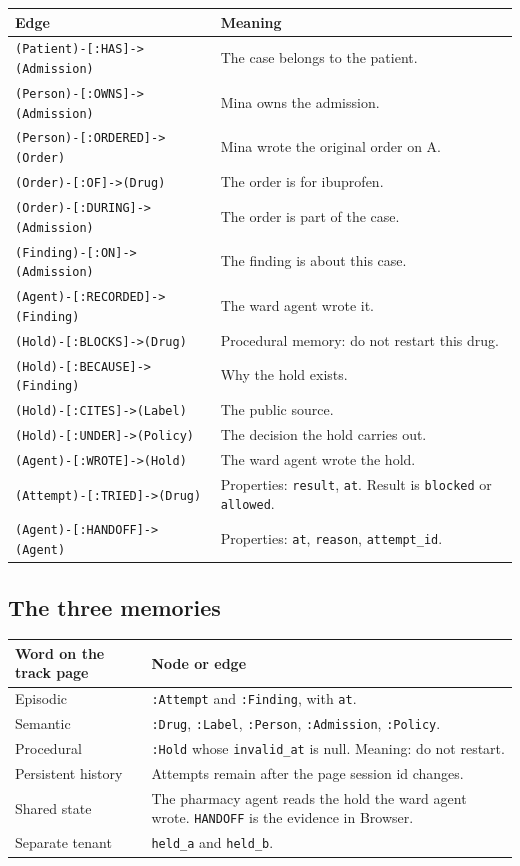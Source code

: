\documentclass[11pt,a4paper]{article}
\newcommand{\code}[1]{\texttt{#1}}
\begin{document}
\begin{center}
\begin{tabular}{@{}ll@{}}
\toprule
\textbf{Edge} & \textbf{Meaning} \\
\midrule
\code{(Patient)-[:HAS]->(Admission)} & The case belongs to the patient. \\
\code{(Person)-[:OWNS]->(Admission)} & Mina owns the admission. \\
\code{(Person)-[:ORDERED]->(Order)} & Mina wrote the original order on A. \\
\code{(Order)-[:OF]->(Drug)} & The order is for ibuprofen. \\
\code{(Order)-[:DURING]->(Admission)} & The order is part of the case. \\
\code{(Finding)-[:ON]->(Admission)} & The finding is about this case. \\
\code{(Agent)-[:RECORDED]->(Finding)} & The ward agent wrote it. \\
\code{(Hold)-[:BLOCKS]->(Drug)} & Procedural memory: do not restart this drug. \\
\code{(Hold)-[:BECAUSE]->(Finding)} & Why the hold exists. \\
\code{(Hold)-[:CITES]->(Label)} & The public source. \\
\code{(Hold)-[:UNDER]->(Policy)} & The decision the hold carries out. \\
\code{(Agent)-[:WROTE]->(Hold)} & The ward agent wrote the hold. \\
\code{(Attempt)-[:TRIED]->(Drug)} & Properties: \code{result}, \code{at}. Result is \code{blocked} or \code{allowed}. \\
\code{(Agent)-[:HANDOFF]->(Agent)} & Properties: \code{at}, \code{reason}, \code{attempt\_id}. \\
\bottomrule
\end{tabular}
\end{center}

\subsection{The three memories}
\label{sec:memorymap}

\begin{center}
\begin{tabularx}{\textwidth}{@{}lX@{}}
\toprule
\textbf{Word on the track page} & \textbf{Node or edge} \\
\midrule
Episodic & \code{:Attempt} and \code{:Finding}, with \code{at}. \\
Semantic & \code{:Drug}, \code{:Label}, \code{:Person}, \code{:Admission}, \code{:Policy}. \\
Procedural & \code{:Hold} whose \code{invalid\_at} is null. Meaning: do not restart. \\
Persistent history & Attempts remain after the page session id changes. \\
Shared state & The pharmacy agent reads the hold the ward agent wrote. \code{HANDOFF} is the evidence in Browser. \\
Separate tenant & \code{held\_a} and \code{held\_b}. \\
\bottomrule
\end{tabularx}
\end{center}
\end{document}
